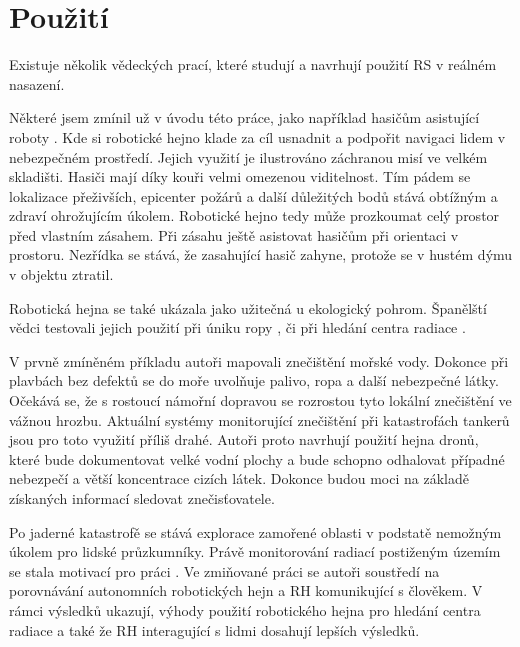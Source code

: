 \section{Použití}
Existuje několik vědeckých prací, které studují a navrhují použití RS v reálném nasazení. 
\par 
Některé jsem zmínil už v úvodu této práce, jako například hasičům asistující roboty \citep{fireRobots}.  Kde si robotické hejno klade za cíl usnadnit a podpořit navigaci lidem v nebezpečném prostředí. Jejich využití je ilustrováno záchranou misí ve velkém skladišti. Hasiči mají díky kouři velmi omezenou viditelnost. Tím pádem se lokalizace přeživších, epicenter požárů a další důležitých bodů stává obtížným a zdraví ohrožujícím úkolem. Robotické hejno tedy může prozkoumat celý prostor před vlastním zásahem. Při zásahu ještě asistovat hasičům při orientaci v prostoru. Nezřídka se stává, že zasahující hasič zahyne, protože se v hustém dýmu v objektu ztratil.
\par
Robotická hejna se také ukázala jako užitečná u ekologický pohrom. Španělští vědci testovali jejich použití při úniku ropy \citep{oilSwarm}, či při hledání centra radiace \citep{radiationSwarm}. 
\par 
V prvně zmíněném příkladu autoři mapovali znečištění mořské vody. Dokonce při plavbách bez defektů se do moře uvolňuje palivo, ropa a další nebezpečné látky. Očekává se, že s rostoucí námořní dopravou se rozrostou tyto lokální znečištění ve vážnou hrozbu. Aktuální systémy monitorující znečištění při katastrofách tankerů jsou pro toto využití příliš drahé. Autoři proto navrhují použití hejna dronů, které bude dokumentovat velké vodní plochy a bude schopno odhalovat případné nebezpečí a větší koncentrace cizích látek. Dokonce budou moci na základě získaných informací sledovat znečisťovatele. 
\par
Po jaderné katastrofě se stává explorace zamořené oblasti  v podstatě nemožným úkolem pro lidské průzkumníky. Právě monitorování radiací postiženým územím se stala motivací pro práci \citep{radiationSwarm}. Ve zmiňované práci se autoři soustředí na porovnávání autonomních robotických hejn a RH komunikující s člověkem. V rámci výsledků ukazují, výhody použití robotického hejna pro hledání centra radiace a také že RH interagující s lidmi dosahují lepších výsledků.
\par
